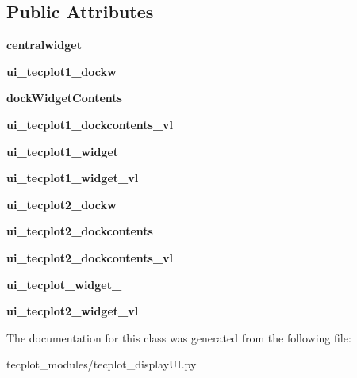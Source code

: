 \subsection*{Public Attributes}
\begin{DoxyCompactItemize}
\item 
\hypertarget{a00121_a8806355d8f5b1e79e73c21d82b2a02b1}{}\label{a00121_a8806355d8f5b1e79e73c21d82b2a02b1} 
{\bfseries centralwidget}
\item 
\hypertarget{a00121_a5bc16af243ddcb715ac4dca3eaeea83f}{}\label{a00121_a5bc16af243ddcb715ac4dca3eaeea83f} 
{\bfseries ui\+\_\+tecplot1\+\_\+dockw}
\item 
\hypertarget{a00121_a5f2617d5cf96b7f5c5eab71716630e9f}{}\label{a00121_a5f2617d5cf96b7f5c5eab71716630e9f} 
{\bfseries dock\+Widget\+Contents}
\item 
\hypertarget{a00121_a669ef5be286de5a4683863273aea2117}{}\label{a00121_a669ef5be286de5a4683863273aea2117} 
{\bfseries ui\+\_\+tecplot1\+\_\+dockcontents\+\_\+vl}
\item 
\hypertarget{a00121_a0e12cc099f3392ddc5763b2e11735c65}{}\label{a00121_a0e12cc099f3392ddc5763b2e11735c65} 
{\bfseries ui\+\_\+tecplot1\+\_\+widget}
\item 
\hypertarget{a00121_a29ec621d9a4d64b9ac2741603bfd4c0b}{}\label{a00121_a29ec621d9a4d64b9ac2741603bfd4c0b} 
{\bfseries ui\+\_\+tecplot1\+\_\+widget\+\_\+vl}
\item 
\hypertarget{a00121_a39ab796d26cd8af1d7b08a1af13f18d3}{}\label{a00121_a39ab796d26cd8af1d7b08a1af13f18d3} 
{\bfseries ui\+\_\+tecplot2\+\_\+dockw}
\item 
\hypertarget{a00121_afcc75b6eb098b33d244b16c759c2b0fd}{}\label{a00121_afcc75b6eb098b33d244b16c759c2b0fd} 
{\bfseries ui\+\_\+tecplot2\+\_\+dockcontents}
\item 
\hypertarget{a00121_a8883278a682ade2e54c270ba2064a3d8}{}\label{a00121_a8883278a682ade2e54c270ba2064a3d8} 
{\bfseries ui\+\_\+tecplot2\+\_\+dockcontents\+\_\+vl}
\item 
\hypertarget{a00121_adf880d85360d7fc4761f74c7ab80e09f}{}\label{a00121_adf880d85360d7fc4761f74c7ab80e09f} 
{\bfseries ui\+\_\+tecplot\+\_\+widget\+\_}
\item 
\hypertarget{a00121_a3b0bcb24fdafc82b684e59b018c76ba9}{}\label{a00121_a3b0bcb24fdafc82b684e59b018c76ba9} 
{\bfseries ui\+\_\+tecplot2\+\_\+widget\+\_\+vl}
\end{DoxyCompactItemize}


The documentation for this class was generated from the following file\+:\begin{DoxyCompactItemize}
\item 
tecplot\+\_\+modules/tecplot\+\_\+display\+U\+I.\+py\end{DoxyCompactItemize}
